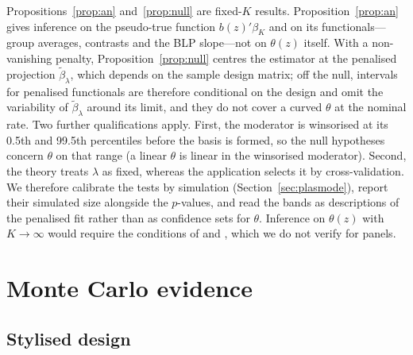 \documentclass[preprint,12pt,authoryear]{elsarticle}
\begin{document}
\begin{remark}\label{rem:scope}
Propositions~\ref{prop:an} and~\ref{prop:null} are fixed-$K$ results. Proposition~\ref{prop:an} gives inference on the pseudo-true function $b(z)'\beta_K$ and on its functionals---group averages, contrasts and the BLP slope---not on $\theta(z)$ itself. With a non-vanishing penalty, Proposition~\ref{prop:null} centres the estimator at the penalised projection $\tilde\beta_\lambda$, which depends on the sample design matrix; off the null, intervals for penalised functionals are therefore conditional on the design and omit the variability of $\tilde\beta_\lambda$ around its limit, and they do not cover a curved $\theta$ at the nominal rate. Two further qualifications apply. First, the moderator is winsorised at its 0.5th and 99.5th percentiles before the basis is formed, so the null hypotheses concern $\theta$ on that range (a linear $\theta$ is linear in the winsorised moderator). Second, the theory treats $\lambda$ as fixed, whereas the application selects it by cross-validation. We therefore calibrate the tests by simulation (Section~\ref{sec:plasmode}), report their simulated size alongside the $p$-values, and read the bands as descriptions of the penalised fit rather than as confidence sets for $\theta$. Inference on $\theta(z)$ with $K\to\infty$ would require the conditions of \citet{belloni2015series} and \citet{semenova2021cate}, which we do not verify for panels.
\end{remark}

\section{Monte Carlo evidence}\label{sec:sim}

\subsection{Stylised design}
\end{document}
